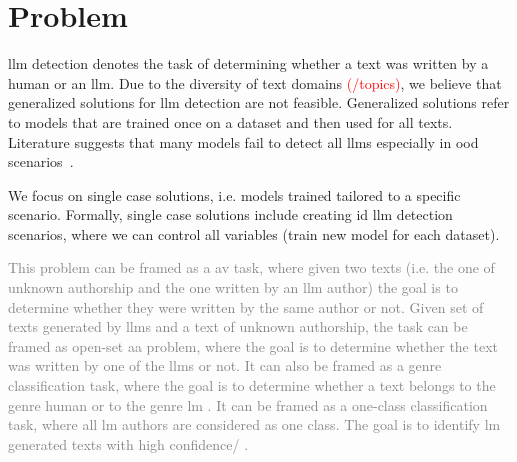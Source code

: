 \section{Problem}
\label{sec:problem}

\ac{llm} detection denotes the task of determining whether a text was written by a human or an \ac{llm}.
Due to the diversity of text domains \textcolor{red}{(/topics)}, we believe that generalized solutions for \ac{llm} detection are not feasible.
Generalized solutions refer to models that are trained once on a dataset and then used for all texts.
Literature suggests that many models fail to detect all \acp{llm} especially in \ac{ood} scenarios~\citep{bhattacharjee_fighting_2024,li_learning_2025}.

We focus on single case solutions, i.e. models trained tailored to a specific scenario.
Formally, single case solutions include creating \ac{id} \ac{llm} detection scenarios, 
where we can control all variables (train new model for each dataset).

\textcolor{gray}{
This problem can be framed as a \ac{av} task, where given two texts 
(i.e. the one of unknown authorship and the one written by an \ac{llm} author) 
the goal is to determine whether they were written by the same author or not.
Given set of texts generated by \acp{llm} and a text of unknown authorship,
the task can be framed as open-set \ac{aa} problem, 
where the goal is to determine whether the text was written by one of the \acp{llm} or not.
It can also be framed as a genre classification task, where the goal is to determine whether a text belongs 
to the genre human or to the genre \ac{lm} .
It can be framed as a one-class classification task, where all \ac{lm} authors are considered as one class.
The goal is to identify \ac{lm} generated texts with high confidence/ .
}

